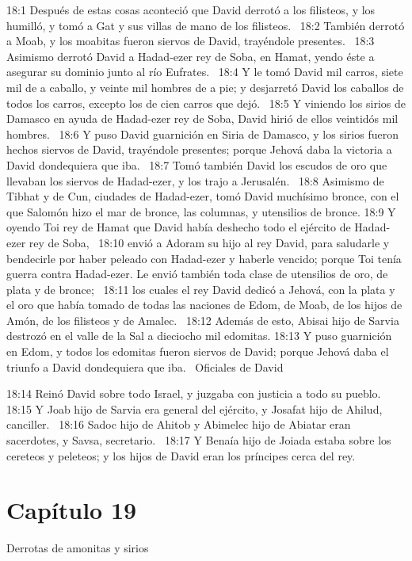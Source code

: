 18:1 Después de estas cosas aconteció que David derrotó a los filisteos, y los humilló, y tomó a Gat y sus villas de mano de los filisteos.  
18:2 También derrotó a Moab, y los moabitas fueron siervos de David, trayéndole presentes.  
18:3 Asimismo derrotó David a Hadad-ezer rey de Soba, en Hamat, yendo éste a asegurar su dominio junto al río Eufrates.  
18:4 Y le tomó David mil carros, siete mil de a caballo, y veinte mil hombres de a pie; y desjarretó David los caballos de todos los carros, excepto los de cien carros que dejó.  
18:5 Y viniendo los sirios de Damasco en ayuda de Hadad-ezer rey de Soba, David hirió de ellos veintidós mil hombres.  
18:6 Y puso David guarnición en Siria de Damasco, y los sirios fueron hechos siervos de David, trayéndole presentes; porque Jehová daba la victoria a David dondequiera que iba.  
18:7 Tomó también David los escudos de oro que llevaban los siervos de Hadad-ezer, y los trajo a Jerusalén.  
18:8 Asimismo de Tibhat y de Cun, ciudades de Hadad-ezer, tomó David muchísimo bronce, con el que Salomón hizo el mar de bronce, las columnas, y utensilios de bronce. 
18:9 Y oyendo Toi rey de Hamat que David había deshecho todo el ejército de Hadad-ezer rey de Soba,  
18:10 envió a Adoram su hijo al rey David, para saludarle y bendecirle por haber peleado con Hadad-ezer y haberle vencido; porque Toi tenía guerra contra Hadad-ezer. Le envió también toda clase de utensilios de oro, de plata y de bronce;  
18:11 los cuales el rey David dedicó a Jehová, con la plata y el oro que había tomado de todas las naciones de Edom, de Moab, de los hijos de Amón, de los filisteos y de Amalec.  
18:12 Además de esto, Abisai hijo de Sarvia destrozó en el valle de la Sal a dieciocho mil edomitas. 
18:13 Y puso guarnición en Edom, y todos los edomitas fueron siervos de David; porque Jehová daba el triunfo a David dondequiera que iba.  
Oficiales de David  

18:14 Reinó David sobre todo Israel, y juzgaba con justicia a todo su pueblo.  
18:15 Y Joab hijo de Sarvia era general del ejército, y Josafat hijo de Ahilud, canciller.  
18:16 Sadoc hijo de Ahitob y Abimelec hijo de Abiatar eran sacerdotes, y Savsa, secretario.  
18:17 Y Benaía hijo de Joiada estaba sobre los cereteos y peleteos; y los hijos de David eran los príncipes cerca del rey. 
\section*{Capítulo 19 }
Derrotas de amonitas y sirios 



